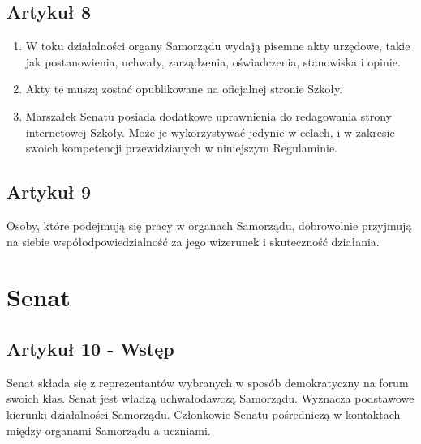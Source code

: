 \documentclass[14pt]{article}
\newenvironment{ustepy}{%
	\begin{enumerate}[leftmargin=1.5em, itemindent=1pt, labelwidth=1em, itemsep=5pt]
	}{%
	\end{enumerate}
}
\begin{document}
\subsection*{Artykuł 8}
\begin{ustepy}
\item W toku działalności organy Samorządu wydają pisemne akty urzędowe, takie jak postanowienia, uchwały, zarządzenia, oświadczenia, stanowiska i opinie.
\item Akty te muszą zostać opublikowane na oficjalnej stronie Szkoły. 
\item Marszałek Senatu posiada dodatkowe uprawnienia do redagowania strony internetowej Szkoły. Może je wykorzystywać jedynie w celach, i w zakresie swoich kompetencji przewidzianych w niniejszym Regulaminie.
\end{ustepy}

\subsection*{Artykuł 9}
Osoby, które podejmują się pracy w organach Samorządu, dobrowolnie przyjmują na siebie współodpowiedzialność za jego wizerunek i skuteczność działania. 

\section{Senat}
\subsection*{Artykuł 10 - Wstęp}
Senat składa się z reprezentantów wybranych w sposób demokratyczny na forum swoich klas. Senat jest władzą uchwałodawczą Samorządu. Wyznacza podstawowe kierunki działalności Samorządu. Członkowie Senatu pośredniczą w kontaktach między organami Samorządu a uczniami.
\end{document}
